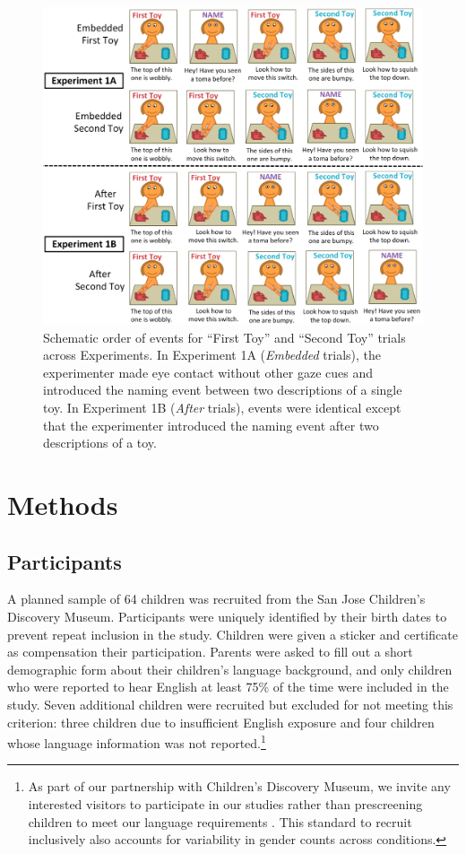 \documentclass[man]{apa2}
\begin{document}
\begin{figure} 
  \begin{center} 
    \includegraphics[width=6in]{figures/continuity_demo_all_trials.png} 
    \caption{\label{fig:demo} Schematic order of events for ``First Toy'' and ``Second Toy'' trials across Experiments. In Experiment 1A (\emph{Embedded} trials), the experimenter made eye contact without other gaze cues and introduced the naming event between two descriptions of a single toy.  In Experiment 1B (\emph{After} trials), events were identical except that the experimenter introduced the naming event after two descriptions of a toy.} 
  \end{center} 
\end{figure}	

\section{Methods}


\subsection{Participants}

A planned sample of 64 children was recruited from the San Jose Children's Discovery Museum.  Participants were uniquely identified by their birth dates to prevent repeat inclusion in the study.  Children were given a sticker and certificate as compensation their participation.  Parents were asked to fill out a short demographic form about their children's language background, and only children who were reported to hear English at least 75\% of the time were included in the study.  Seven additional children were recruited but excluded for not meeting this criterion: three children due to insufficient English exposure and four children whose language information was not reported.\footnote{As part of our partnership with Children's Discovery Museum, we invite any interested visitors to participate in our studies rather than prescreening children to meet our language requirements \cite{callanan2012}. This standard to recruit inclusively also accounts for variability in gender counts across conditions.}
\end{document}
